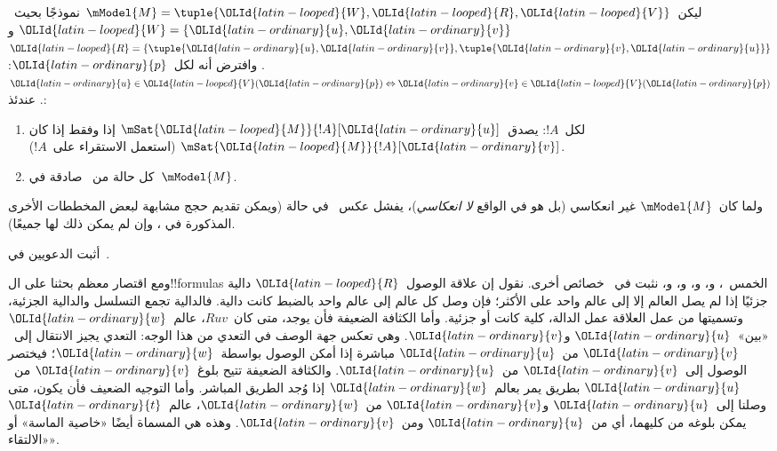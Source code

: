 \documentclass[../../../include/open-logic-section]{subfiles}
\begin{document}
\begin{prop}
  ليكن~$\mModel{M} = \tuple{\OLId{latin-looped}{W}, \OLId{latin-looped}{R}, \OLId{latin-looped}{V}}$ نموذجًا بحيث~$\OLId{latin-looped}{W} = \{\OLId{latin-ordinary}{u}, \OLId{latin-ordinary}{v}\}$
  و$\OLId{latin-looped}{R} = \{\tuple{\OLId{latin-ordinary}{u},\OLId{latin-ordinary}{v}}, \tuple{\OLId{latin-ordinary}{v},\OLId{latin-ordinary}{u}}\}$. وافترض أنه لكل~$\OLId{latin-ordinary}{p}$:
  $\OLId{latin-ordinary}{u} \in \OLId{latin-looped}{V}(\OLId{latin-ordinary}{p}) \Leftrightarrow \OLId{latin-ordinary}{v} \in \OLId{latin-looped}{V}(\OLId{latin-ordinary}{p})$. عندئذ:
  \begin{enumerate}
  \item لكل~$!A$: يصدق~$\mSat{\OLId{latin-looped}{M}}{!A}[\OLId{latin-ordinary}{u}]$ إذا وفقط إذا كان
    $\mSat{\OLId{latin-looped}{M}}{!A}[\OLId{latin-ordinary}{v}]$ (استعمل الاستقراء على~$!A$).
  \item كل حالة من~ صادقة في~$\mModel{M}$.
  \end{enumerate}
  ولما كان~$\mModel{M}$ غير انعكاسي (بل هو في الواقع
  \emph{لا انعكاسي})، يفشل عكس~ في حالة
   (ويمكن تقديم حجج مشابهة لبعض المخططات الأخرى المذكورة في
  ، وإن لم يمكن ذلك لها جميعًا).
\end{prop}

\begin{prob}
  أثبت الدعويين في~.
\end{prob}

ومع اقتصار معظم بحثنا على ال!!{formula}s الخمس~، و،
و، و، و، نثبت في~
خصائص أخرى. نقول إن علاقة الوصول~$\OLId{latin-looped}{R}$ دالية جزئيًا إذا لم يصل
العالم إلا إلى عالم واحد على الأكثر؛ فإن وصل كل عالم إلى عالم واحد
بالضبط كانت دالية. فالدالية تجمع التسلسل والدالية الجزئية، وتسميتها
من عمل العلاقة عمل الدالة، كلية كانت أو جزئية.
وأما الكثافة الضعيفة فأن يوجد، متى كان~$Ruv$، عالم~$\OLId{latin-ordinary}{w}$
«بين»~$\OLId{latin-ordinary}{u}$ و$\OLId{latin-ordinary}{v}$. وهي تعكس جهة الوصف في التعدي من هذا الوجه:
التعدي يجيز الانتقال إلى~$\OLId{latin-ordinary}{v}$ من~$\OLId{latin-ordinary}{u}$ مباشرة إذا أمكن الوصول
بواسطة~$\OLId{latin-ordinary}{w}$؛ فيختصر الوصول إلى~$\OLId{latin-ordinary}{v}$ من~$\OLId{latin-ordinary}{u}$.
والكثافة الضعيفة تتيح بلوغ~$\OLId{latin-ordinary}{v}$ من~$\OLId{latin-ordinary}{u}$ بطريق يمر بعالم~$\OLId{latin-ordinary}{w}$
إذا وُجد الطريق المباشر.
وأما التوجيه الضعيف فأن يكون، متى وصلنا إلى~$\OLId{latin-ordinary}{u}$ و$\OLId{latin-ordinary}{v}$ من~$\OLId{latin-ordinary}{w}$،
عالم~$\OLId{latin-ordinary}{t}$ يمكن بلوغه من كليهما، أي من~$\OLId{latin-ordinary}{u}$ ومن~$\OLId{latin-ordinary}{v}$.
وهذه هي المسماة أيضًا «خاصية الماسة» أو «الالتقاء».
\end{document}
